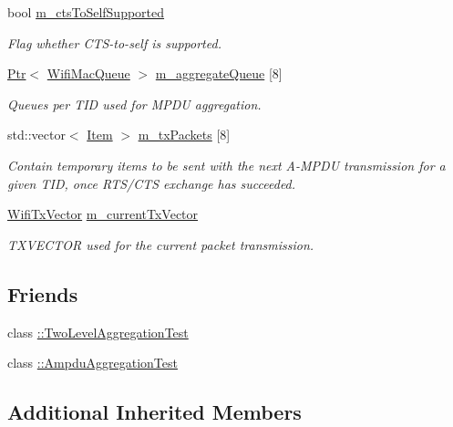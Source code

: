 \begin{DoxyCompactItemize}
bool \hyperlink{classns3_1_1MacLow_a3f4e1bf0128e68f6d2b708d66357ac5e}{m\+\_\+cts\+To\+Self\+Supported}
\begin{DoxyCompactList}\small\item\em Flag whether C\+T\+S-\/to-\/self is supported. \end{DoxyCompactList}\item 
\hyperlink{classns3_1_1Ptr}{Ptr}$<$ \hyperlink{namespacens3_a3ca96bcdf02c0e7cacea08ca62ead54c}{Wifi\+Mac\+Queue} $>$ \hyperlink{classns3_1_1MacLow_a50ea30f5dff00a3ef2683b9275717c6f}{m\+\_\+aggregate\+Queue} \mbox{[}8\mbox{]}
\begin{DoxyCompactList}\small\item\em Queues per T\+ID used for M\+P\+DU aggregation. \end{DoxyCompactList}\item 
std\+::vector$<$ \hyperlink{structns3_1_1MacLow_1_1Item}{Item} $>$ \hyperlink{classns3_1_1MacLow_ab8e0468b74624573dc87630e41050206}{m\+\_\+tx\+Packets} \mbox{[}8\mbox{]}
\begin{DoxyCompactList}\small\item\em Contain temporary items to be sent with the next A-\/\+M\+P\+DU transmission for a given T\+ID, once R\+T\+S/\+C\+TS exchange has succeeded. \end{DoxyCompactList}\item 
\hyperlink{classns3_1_1WifiTxVector}{Wifi\+Tx\+Vector} \hyperlink{classns3_1_1MacLow_af87bd81ded4d362f9f1dc89dbbee65a3}{m\+\_\+current\+Tx\+Vector}
\begin{DoxyCompactList}\small\item\em T\+X\+V\+E\+C\+T\+OR used for the current packet transmission. \end{DoxyCompactList}\end{DoxyCompactItemize}
\subsection*{Friends}
\begin{DoxyCompactItemize}
\item 
class \hyperlink{classns3_1_1MacLow_a59c458327e669c30a9ba73441c96c03e}{\+::\+Two\+Level\+Aggregation\+Test}
\item 
class \hyperlink{classns3_1_1MacLow_ac40416d983d6f5074b1f4d2d84900b75}{\+::\+Ampdu\+Aggregation\+Test}
\end{DoxyCompactItemize}
\subsection*{Additional Inherited Members}


